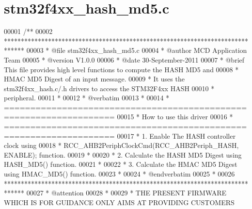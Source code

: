 \section{stm32f4xx\+\_\+hash\+\_\+md5.\+c}
\label{stm32f4xx__hash__md5_8c_source}

\begin{DoxyCode}
00001 \textcolor{comment}{/**}
00002 \textcolor{comment}{  ******************************************************************************}
00003 \textcolor{comment}{  * @file    stm32f4xx\_hash\_md5.c}
00004 \textcolor{comment}{  * @author  MCD Application Team}
00005 \textcolor{comment}{  * @version V1.0.0}
00006 \textcolor{comment}{  * @date    30-September-2011}
00007 \textcolor{comment}{  * @brief   This file provides high level functions to compute the HASH MD5 and}
00008 \textcolor{comment}{  *          HMAC MD5 Digest of an input message.}
00009 \textcolor{comment}{  *          It uses the stm32f4xx\_hash.c/.h drivers to access the STM32F4xx HASH}
00010 \textcolor{comment}{  *          peripheral.}
00011 \textcolor{comment}{  *}
00012 \textcolor{comment}{  *  @verbatim}
00013 \textcolor{comment}{  *    }
00014 \textcolor{comment}{  *          ===================================================================}
00015 \textcolor{comment}{  *                                   How to use this driver}
00016 \textcolor{comment}{  *          ===================================================================}
00017 \textcolor{comment}{  *          1. Enable The HASH controller clock using }
00018 \textcolor{comment}{  *            RCC\_AHB2PeriphClockCmd(RCC\_AHB2Periph\_HASH, ENABLE); function.}
00019 \textcolor{comment}{  *}
00020 \textcolor{comment}{  *          2. Calculate the HASH MD5 Digest using HASH\_MD5() function.}
00021 \textcolor{comment}{  *}
00022 \textcolor{comment}{  *          3. Calculate the HMAC MD5 Digest using HMAC\_MD5() function.}
00023 \textcolor{comment}{  *}
00024 \textcolor{comment}{  *  @endverbatim}
00025 \textcolor{comment}{  *}
00026 \textcolor{comment}{  ******************************************************************************}
00027 \textcolor{comment}{  * @attention}
00028 \textcolor{comment}{  *}
00029 \textcolor{comment}{  * THE PRESENT FIRMWARE WHICH IS FOR GUIDANCE ONLY AIMS AT PROVIDING CUSTOMERS}

\end{DoxyCode}
